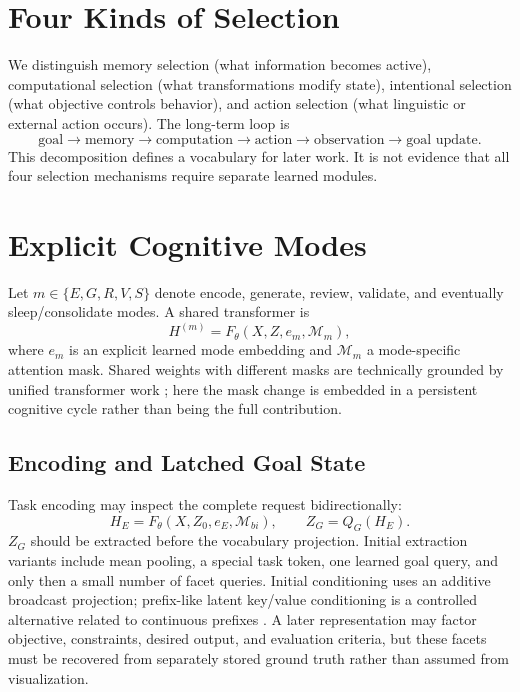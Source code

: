 \documentclass[11pt]{article}
\begin{document}
\section{Four Kinds of Selection}
We distinguish memory selection (what information becomes active), computational selection (what transformations modify state), intentional selection (what objective controls behavior), and action selection (what linguistic or external action occurs). The long-term loop is
\begin{equation}
\boxed{\text{goal}\rightarrow\text{memory}\rightarrow\text{computation}\rightarrow\text{action}\rightarrow\text{observation}\rightarrow\text{goal update}}.
\end{equation}
This decomposition defines a vocabulary for later work. It is not evidence that all four selection mechanisms require separate learned modules.

\section{Explicit Cognitive Modes}
Let $m\in\{E,G,R,V,S\}$ denote encode, generate, review, validate, and eventually sleep/consolidate modes. A shared transformer is
\begin{equation}
H^{(m)}=F_\theta(X,Z,e_m,\mathcal M_m),
\end{equation}
where $e_m$ is an explicit learned mode embedding and $\mathcal M_m$ a mode-specific attention mask. Shared weights with different masks are technically grounded by unified transformer work \citep{dong2019unified}; here the mask change is embedded in a persistent cognitive cycle rather than being the full contribution.

\subsection{Encoding and Latched Goal State}
Task encoding may inspect the complete request bidirectionally:
\begin{equation}
H_E=F_\theta(X,Z_0,e_E,\mathcal M_{bi}),\qquad Z_G=Q_G(H_E).
\end{equation}
$Z_G$ should be extracted before the vocabulary projection. Initial extraction variants include mean pooling, a special task token, one learned goal query, and only then a small number of facet queries. Initial conditioning uses an additive broadcast projection; prefix-like latent key/value conditioning is a controlled alternative related to continuous prefixes \citep{li2021prefixtuning}. A later representation may factor objective, constraints, desired output, and evaluation criteria, but these facets must be recovered from separately stored ground truth rather than assumed from visualization.
\end{document}
